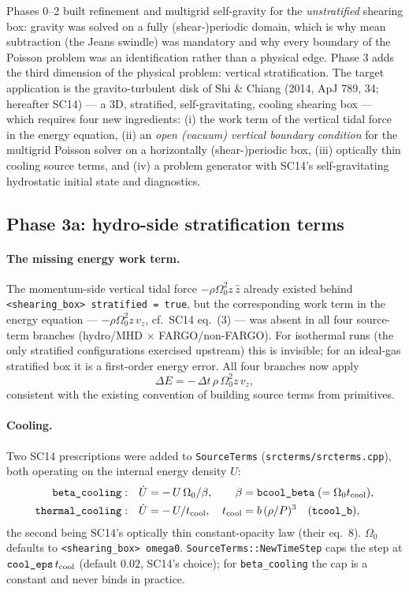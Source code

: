 \documentclass[11pt]{article}
\newcommand{\code}[1]{\texttt{#1}}
\newcommand{\file}[1]{\texttt{\small #1}}
\newcommand{\fn}[1]{\texttt{\small #1}}
\newcommand{\Om}{\Omega_0}
\begin{document}
Phases 0--2 built refinement and multigrid self-gravity for the \emph{unstratified}
shearing box: gravity was solved on a fully (shear-)periodic domain, which is why mean
subtraction (the Jeans swindle) was mandatory and why every boundary of the Poisson
problem was an identification rather than a physical edge. Phase 3 adds the third
dimension of the physical problem: vertical stratification. The target application is
the gravito-turbulent disk of Shi \& Chiang (2014, ApJ 789, 34; hereafter SC14) ---
a 3D, stratified, self-gravitating, cooling shearing box --- which requires four new
ingredients: (i) the work term of the vertical tidal force in the energy equation,
(ii) an \emph{open (vacuum) vertical boundary condition} for the multigrid Poisson
solver on a horizontally (shear-)periodic box, (iii) optically thin cooling source
terms, and (iv) a problem generator with SC14's self-gravitating hydrostatic initial
state and diagnostics.

\subsection{Phase 3a: hydro-side stratification terms}
\label{sec:phase3a}

\paragraph{The missing energy work term.} The momentum-side vertical tidal force
$-\rho\Om^2 z\,\hat z$ already existed behind \code{<shearing\_box>
stratified\,=\,true}, but the corresponding work term in the energy equation ---
$-\rho\Om^2 z\,v_z$, cf.\ SC14 eq.~(3) --- was absent in all four source-term
branches (hydro/MHD $\times$ FARGO/non-FARGO). For isothermal runs (the only
stratified configurations exercised upstream) this is invisible; for an ideal-gas
stratified box it is a first-order energy error. All four branches now apply
\begin{equation}
  \Delta E = -\,\Delta t\,\rho\,\Om^2 z\, v_z ,
\end{equation}
consistent with the existing convention of building source terms from primitives.

\paragraph{Cooling.} Two SC14 prescriptions were added to \code{SourceTerms}
(\file{srcterms/srcterms.cpp}), both operating on the internal energy density $U$:
\begin{align}
  \code{beta\_cooling}&: & \dot U &= -\,U\,\Om/\beta ,
    & \beta &= \code{bcool\_beta} \;(=\Om t_{\rm cool}), \\
  \code{thermal\_cooling}&: & \dot U &= -\,U/t_{\rm cool}, &
    t_{\rm cool} &= b\,(\rho/P)^3 \quad (\code{tcool\_b}),
\end{align}
the second being SC14's optically thin constant-opacity law (their eq.~8).
$\Om$ defaults to \code{<shearing\_box>~omega0}. \fn{SourceTerms::NewTimeStep} caps
the step at $\code{cool\_eps}\,t_{\rm cool}$ (default $0.02$, SC14's choice); for
\code{beta\_cooling} the cap is a constant and never binds in practice.
\end{document}
